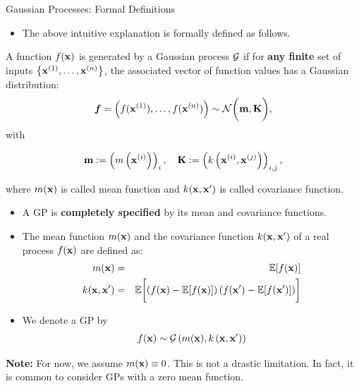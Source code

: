 \begin{frame}[c,allowframebreaks]{Gaussian Processes: Formal Definitions}

\begin{itemize}
\item The above intuitive explanation is formally defined as follows. 
\end{itemize}

\vspace{.7cm}

\begin{displayquote}
A function $f(\mathbf{x})$ is generated by a Gaussian process $\mathcal{G}$ if for \textbf{any finite} set of inputs $\left\{\mathbf{x}^{(1)},\dots,\mathbf{x}^{(n)}\right\}$, the associated vector of function values has a Gaussian distribution:
$$\bm{f} = \left(f(\mathbf{x}^{(1)}),\dots, f(\mathbf{x}^{(n)})\right) \sim\mathcal{N}\biggl(\textbf{m},\textbf{K}\biggr),$$ with 

$$\textbf{m}:= \left(m\left(\mathbf{x}^{(i)}\right)\right)_{i}, \quad
\textbf{K}:= \left(k\left(\mathbf{x}^{(i)}, \mathbf{x}^{(j)}\right)\right)_{i,j},$$ 

where $m(\mathbf{x})$ is called mean function and $k(\mathbf{x}, \mathbf{x}^\prime)$ is called covariance function.
\end{displayquote}

\framebreak


\begin{itemize}

\item A GP is \textbf{completely specified} by its mean and covariance functions.
\vspace{.2cm}

\item The mean function $m(\mathbf{x})$ and the covariance function $k(\mathbf{x}, \mathbf{x}^\prime)$ of a real process $f(\mathbf{x})$ are defined as:
\vspace{-.4cm}
\begin{eqnarray*}
m(\mathbf{x}) &=& \mathbb{E}[f(\mathbf{x})] \\
k(\mathbf{x}, \mathbf{x}^\prime) &=& \mathbb{E}\biggl[\left( f(\mathbf{x}) - \mathbb{E}[f(\mathbf{x})] \right) \left( f(\mathbf{x}^\prime) - \mathbb{E}[f(\mathbf{x}^\prime)] \right)\biggr]
\end{eqnarray*}

\vspace{.2cm}

\item We denote a GP by
\vspace{-.1cm}
$$f(\mathbf{x}) \sim \mathcal{G}\left(m(\mathbf{x}), k\left(\mathbf{x}, \mathbf{x}^\prime\right)\right) $$
\end{itemize}

\vspace{.3cm}

\textbf{Note:} For now, we assume $m(\mathbf{x})\equiv 0$. This is not a drastic limitation. In fact, it is common to consider GPs with a zero mean function.

\end{frame}
